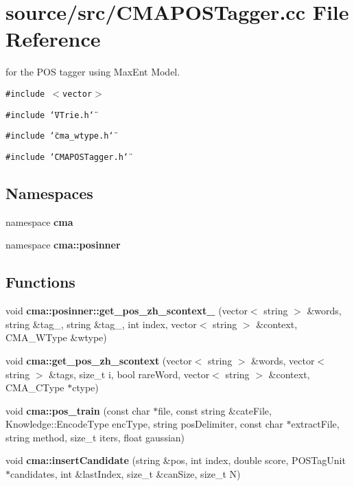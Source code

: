 \section{source/src/CMAPOSTagger.cc File Reference}
\label{CMAPOSTagger_8cc}
for the POS tagger using MaxEnt Model. 

{\tt \#include $<$vector$>$}\par
{\tt \#include \char`\"{}VTrie.h\char`\"{}}\par
{\tt \#include \char`\"{}cma\_\-wtype.h\char`\"{}}\par
{\tt \#include \char`\"{}CMAPOSTagger.h\char`\"{}}\par
\subsection*{Namespaces}
\begin{CompactItemize}
\item 
namespace \textbf{cma}
\item 
namespace \textbf{cma::posinner}
\end{CompactItemize}
\subsection*{Functions}
\begin{CompactItemize}
\item 
void \textbf{cma::posinner::get\_\-pos\_\-zh\_\-scontext\_} (vector$<$ string $>$ \&words, string \&tag\_, string \&tag\_, int index, vector$<$ string $>$ \&context, CMA\_\-WType \&wtype)\label{namespacecma_1_1posinner_f49e6c147898b0b7d3e88af33c64e8f1}

\item 
void {\bf cma::get\_\-pos\_\-zh\_\-scontext} (vector$<$ string $>$ \&words, vector$<$ string $>$ \&tags, size\_\-t i, bool rareWord, vector$<$ string $>$ \&context, CMA\_\-CType $\ast$ctype)
\item 
void {\bf cma::pos\_\-train} (const char $\ast$file, const string \&cateFile, Knowledge::EncodeType encType, string posDelimiter, const char $\ast$extractFile, string method, size\_\-t iters, float gaussian)
\item 
void \textbf{cma::insertCandidate} (string \&pos, int index, double score, POSTagUnit $\ast$candidates, int \&lastIndex, size\_\-t \&canSize, size\_\-t N)\label{namespacecma_dbf7620e7e9b8dd78dbcb87e648fa8ae}

\end{CompactItemize}
